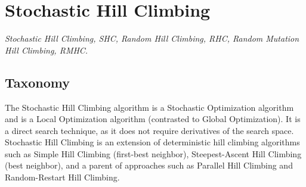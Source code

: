 

\section{Stochastic Hill Climbing} 
\label{sec:stochastic_hill_climbing}

\emph{Stochastic Hill Climbing, SHC, Random Hill Climbing, RHC, Random Mutation Hill Climbing, RMHC.}

\subsection{Taxonomy}
The Stochastic Hill Climbing algorithm is a Stochastic Optimization algorithm and is a Local Optimization algorithm (contrasted to Global Optimization). It is a direct search technique, as it does not require derivatives of the search space.
Stochastic Hill Climbing is an extension of deterministic hill climbing algorithms such as Simple Hill Climbing (first-best neighbor), Steepest-Ascent Hill Climbing (best neighbor), and a parent of approaches such as Parallel Hill Climbing and Random-Restart Hill Climbing.

